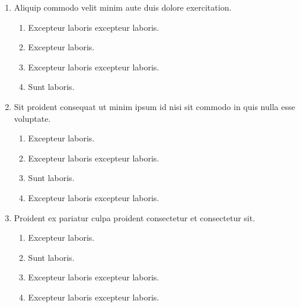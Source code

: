 \documentclass[a4paper,12pt]{article}
\begin{document}
\begin{enumerate}[label=\textbf{\arabic*.}]
\begin{multicols}{2}
\end{multicols}
\item Aliquip commodo velit minim aute duis dolore exercitation.
\begin{multicols}{2}
	\begin{enumerate}
		\item  Excepteur laboris excepteur laboris.
    
		\item  Excepteur laboris.
    
		\item  Excepteur laboris excepteur laboris.
  
		\item  Sunt laboris.
    
	\end{enumerate}

\end{multicols}
\item Sit proident consequat ut minim ipsum id nisi sit commodo in quis nulla esse voluptate.
\begin{multicols}{2}
	\begin{enumerate}
		\item  Excepteur laboris.
    
		\item  Excepteur laboris excepteur laboris.
    
		\item  Sunt laboris.
    
		\item  Excepteur laboris excepteur laboris.
  
	\end{enumerate}

\end{multicols}
\item Proident ex pariatur culpa proident consectetur et consectetur sit.
\begin{multicols}{2}
	\begin{enumerate}
		\item  Excepteur laboris.
    
		\item  Sunt laboris.
    
		\item  Excepteur laboris excepteur laboris.
    
		\item  Excepteur laboris excepteur laboris.
  
	\end{enumerate}


\end{multicols}
\end{enumerate}
\end{document}
